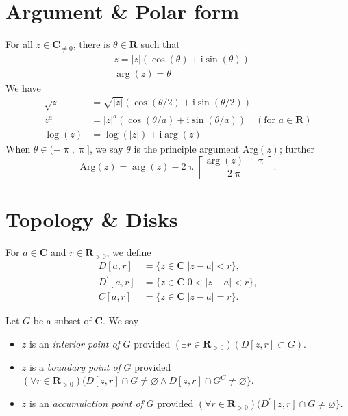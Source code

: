\documentclass[letterpaper,landscape,9pt,fleqn]{extarticle}
\newcommand{\reals}{\mathbf{R}}
\newcommand{\complex}{\mathbf{C}}
\newcommand{\im}{\mathrm{i}}
\newcommand{\Arg}{\mathrm{Arg}}
\begin{document}
\begin{multicols*}{3}
\section*{Argument \& Polar form}
For all \(z \in \complex_{\neq 0}\), there is 
\(\theta \in \reals\) such that
\begin{alignat*}{1}
   &z = |z| (\cos(\theta) + \im \sin(\theta)) \\
   &\arg(z) = \theta
\end{alignat*}
We have
\begin{alignat*}{1}
  \sqrt{z} &= \sqrt{|z|} (\cos(\theta/2) + \im \sin(\theta/2)) \\
  z^a &= |z|^a  (\cos(\theta/a) + \im \sin(\theta/a))  \quad (\mbox{for } a \in \reals) \\
  \log(z) &= \log(|z|) + \im \arg(z)
\end{alignat*}
When \(\theta \in (-\uppi, \uppi]\), we say $\theta$ is the 
principle argument \(\Arg(z) \); further
\begin{equation*}
  \Arg(z) = \arg(z) - 2 \uppi \left \lceil 
     \frac{\arg(z) - \uppi}{2 \uppi} \right \rceil.
\end{equation*}


 
\section*{Topology \& Disks}
For $a \in \complex$ and $r \in \reals_{>0}$, we define
\begin{align*}
  D[a,r] &= \{z \in \complex | |z-a| < r \}, \\
  D^\prime[a,r] &= \{z \in \complex | 0 < |z-a| < r \}, \\
  C[a,r] &= \{z \in \complex | |z-a| = r \}.
\end{align*}

Let $G$ be a subset of $\complex$. We say 
\begin{itemize}
  \item $z$ is an \emph{interior point of} $G$ provided
  \((\exists r \in \reals_{>0})(D[z,r] \subset G) \).

  \item $z$ is a \emph{boundary point of} $G$ provided
  \((\forall r \in \reals_{>0})(D[z,r] \cap G \neq \varnothing \land
  D[z,r] \cap G^C \neq \varnothing \}\).

  \item $z$ is an \emph{accumulation point of} $G$ provided
  \((\forall r \in \reals_{>0})(D^\prime [z,r] \cap G \neq \varnothing \}\).


\end{itemize}
\end{multicols*}
\end{document}
